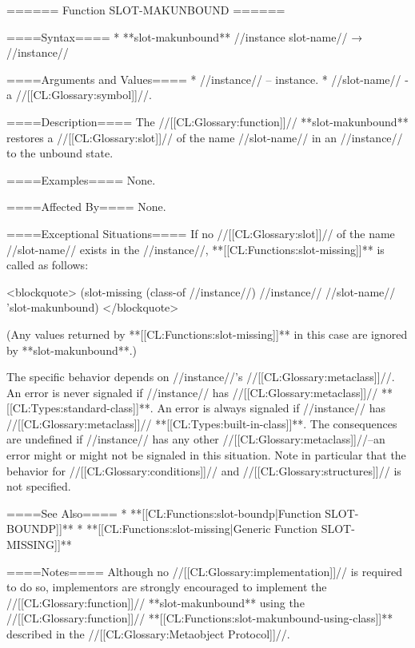 ====== Function SLOT-MAKUNBOUND ======

====Syntax====
  * **slot-makunbound** //instance slot-name// → //instance//

====Arguments and Values====
  * //instance// -- instance.
  * //slot-name// - a //[[CL:Glossary:symbol]]//.

====Description====
The //[[CL:Glossary:function]]// **slot-makunbound** restores a //[[CL:Glossary:slot]]// of the name //slot-name// in an //instance// to the unbound state.

====Examples====
None.

====Affected By====
None.

====Exceptional Situations====
If no //[[CL:Glossary:slot]]// of the name //slot-name// exists in the //instance//, **[[CL:Functions:slot-missing]]** is called as follows:

<blockquote> 
(slot-missing (class-of //instance//) //instance// //slot-name// 'slot-makunbound) 
</blockquote>

(Any values returned by **[[CL:Functions:slot-missing]]** in this case are ignored by **slot-makunbound**.)

The specific behavior depends on //instance//'s //[[CL:Glossary:metaclass]]//. An error is never signaled if //instance// has //[[CL:Glossary:metaclass]]// **[[CL:Types:standard-class]]**. An error is always signaled if //instance// has //[[CL:Glossary:metaclass]]// **[[CL:Types:built-in-class]]**. The consequences are undefined if //instance// has any other //[[CL:Glossary:metaclass]]//--an error might or might not be signaled in this situation. Note in particular that the behavior for //[[CL:Glossary:conditions]]// and //[[CL:Glossary:structures]]// is not specified.

====See Also====
  * **[[CL:Functions:slot-boundp|Function SLOT-BOUNDP]]**
  * **[[CL:Functions:slot-missing|Generic Function SLOT-MISSING]]**

====Notes====
Although no //[[CL:Glossary:implementation]]// is required to do so, implementors are strongly encouraged to implement the //[[CL:Glossary:function]]// **slot-makunbound** using the //[[CL:Glossary:function]]// **[[CL:Functions:slot-makunbound-using-class]]** described in the //[[CL:Glossary:Metaobject Protocol]]//. 

 
